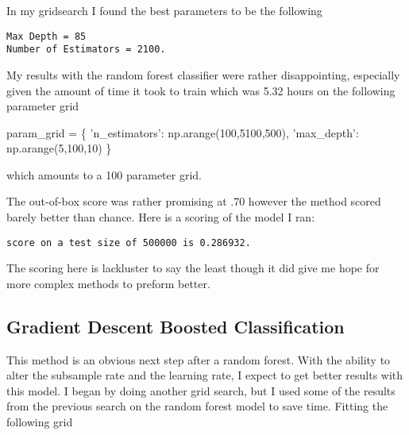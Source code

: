 \documentclass[11pt]{article}
\newenvironment{Shaded}{}{}
\newcommand{\DecValTok}[1]{\textcolor[rgb]{0.25,0.63,0.44}{{#1}}}
\newcommand{\StringTok}[1]{\textcolor[rgb]{0.25,0.44,0.63}{{#1}}}
\newcommand{\NormalTok}[1]{{#1}}
\newcommand{\OperatorTok}[1]{\textcolor[rgb]{0.40,0.40,0.40}{{#1}}}
\begin{document}
In my gridsearch I found the best parameters to be the following

    \begin{Verbatim}[commandchars=\\\{\}]
Max Depth = 85
Number of Estimators = 2100.

    \end{Verbatim}

    My results with the random forest classifier were rather disappointing,
especially given the amount of time it took to train which was 5.32
hours on the following parameter grid

\begin{Shaded}
\begin{Highlighting}[]
\NormalTok{param_grid }\OperatorTok{=}\NormalTok{ \{}
    \StringTok{'n_estimators'}\NormalTok{: np.arange(}\DecValTok{100}\NormalTok{,}\DecValTok{5100}\NormalTok{,}\DecValTok{500}\NormalTok{),}
    \StringTok{'max_depth'}\NormalTok{: np.arange(}\DecValTok{5}\NormalTok{,}\DecValTok{100}\NormalTok{,}\DecValTok{10}\NormalTok{)}
\NormalTok{\}}
\end{Highlighting}
\end{Shaded}

which amounts to a 100 parameter grid.

The out-of-box score was rather promising at .70 however the method
scored barely better than chance. Here is a scoring of the model I ran:

    \begin{Verbatim}[commandchars=\\\{\}]
score on a test size of 500000 is 0.286932.

    \end{Verbatim}

    The scoring here is lackluster to say the least though it did give me
hope for more complex methods to preform better.

\hypertarget{gradient-descent-boosted-classification}{%
\subsection{Gradient Descent Boosted
Classification}\label{gradient-descent-boosted-classification}}

This method is an obvious next step after a random forest. With the
ability to alter the subsample rate and the learning rate, I expect to
get better results with this model. I began by doing another grid
search, but I used some of the results from the previous search on the
random forest model to save time. Fitting the following grid
\end{document}
